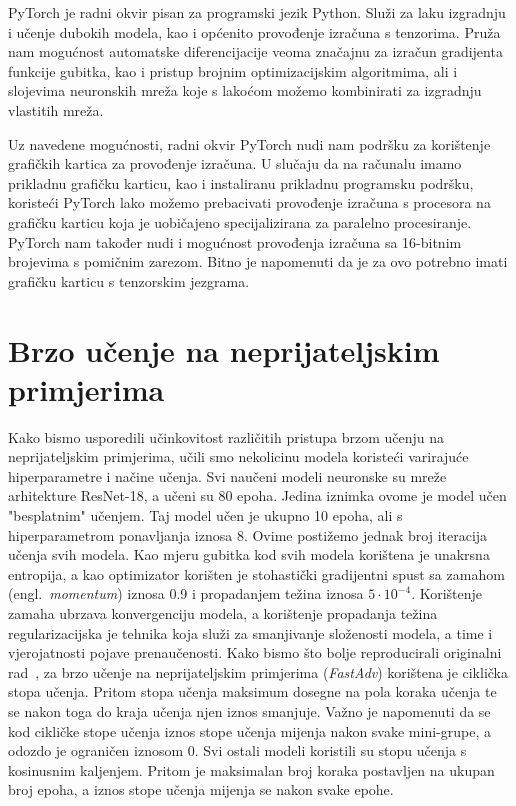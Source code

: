 \documentclass[times, utf8, zavrsni, numeric]{fer}
\begin{document}
PyTorch je radni okvir pisan za programski jezik Python.
Služi za laku izgradnju i učenje dubokih modela, kao i općenito provođenje izračuna s tenzorima.
Pruža nam mogućnost automatske diferencijacije veoma značajnu za izračun gradijenta funkcije gubitka, kao i pristup brojnim optimizacijskim algoritmima, 
ali i slojevima neuronskih mreža koje s lakoćom možemo kombinirati za izgradnju vlastitih mreža.

\pagebreak

Uz navedene mogućnosti, radni okvir PyTorch nudi nam podršku za korištenje grafičkih kartica za provođenje izračuna.
U slučaju da na računalu imamo prikladnu grafičku karticu, kao i instaliranu prikladnu programsku podršku, 
koristeći PyTorch lako možemo prebacivati provođenje izračuna s procesora na grafičku karticu koja je uobičajeno specijalizirana za paralelno procesiranje.
PyTorch nam također nudi i mogućnost provođenja izračuna sa 16-bitnim brojevima s pomičnim zarezom. Bitno je napomenuti da je za ovo potrebno imati grafičku karticu s tenzorskim jezgrama.

\section{Brzo učenje na neprijateljskim primjerima}

Kako bismo usporedili učinkovitost različitih pristupa brzom učenju na neprijateljskim primjerima, učili smo nekolicinu modela koristeći varirajuće hiperparametre i načine učenja.
Svi naučeni modeli neuronske su mreže arhitekture ResNet-18, a učeni su 80 epoha. Jedina iznimka ovome je model učen "besplatnim" učenjem. Taj model učen je ukupno 10 epoha, ali s hiperparametrom ponavljanja iznosa 8.
Ovime postižemo jednak broj iteracija učenja svih modela.
Kao mjeru gubitka kod svih modela korištena je unakrsna entropija, a kao optimizator korišten je stohastički gradijentni spust sa zamahom (engl.\ \textit{momentum}) iznosa 0.9 i propadanjem težina iznosa $5 \cdot 10^{-4}$.
Korištenje zamaha ubrzava konvergenciju modela, a korištenje propadanja težina regularizacijska je tehnika koja služi za smanjivanje složenosti modela, a time i vjerojatnosti pojave prenaučenosti.
Kako bismo što bolje reproducirali originalni rad~\cite{wong2020fast}, 
za brzo učenje na neprijateljskim primjerima (\textit{FastAdv}) korištena je ciklička stopa učenja. Pritom stopa učenja maksimum dosegne na pola koraka učenja te se nakon toga do kraja učenja njen iznos smanjuje. 
Važno je napomenuti da se kod cikličke stope učenja iznos stope učenja mijenja nakon svake mini-grupe, a odozdo je ograničen iznosom 0.
Svi ostali modeli koristili su stopu učenja s kosinusnim kaljenjem. Pritom je maksimalan broj koraka postavljen na ukupan broj epoha, a iznos stope učenja mijenja se nakon svake epohe.
\end{document}
